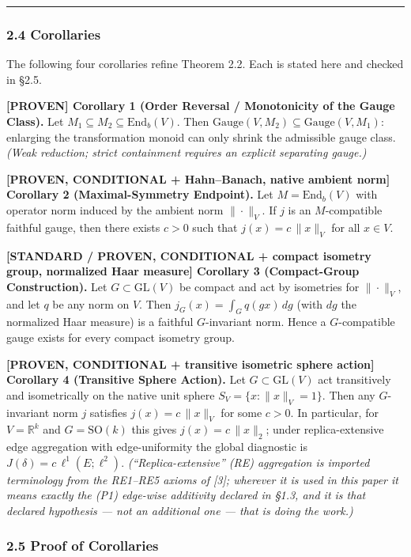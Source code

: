 \documentclass[
  11pt,
]{article}
\renewenvironment{quote}
  {\begin{leftbar}\small}
  {\end{leftbar}}
\begin{document}
\begin{center}\rule{0.5\linewidth}{0.5pt}\end{center}

\subsubsection{2.4 Corollaries}\label{corollaries}

The following four corollaries refine Theorem 2.2. Each is stated here and checked in §2.5.

\begin{quote}
\textbf{{[}PROVEN{]} Corollary 1 (Order Reversal / Monotonicity of the Gauge Class).} Let \(M_1 \subseteq M_2 \subseteq \mathrm{End}_b(V)\). Then \(\mathrm{Gauge}(V, M_2) \subseteq \mathrm{Gauge}(V, M_1)\): enlarging the transformation monoid can only shrink the admissible gauge class. \emph{(Weak reduction; strict containment requires an explicit separating gauge.)}

\textbf{{[}PROVEN, CONDITIONAL + Hahn--Banach, native ambient norm{]} Corollary 2 (Maximal-Symmetry Endpoint).} Let \(M = \mathrm{End}_b(V)\) with operator norm induced by the ambient norm \(\|\cdot\|_V\). If \(j\) is an \(M\)-compatible faithful gauge, then there exists \(c > 0\) such that \(j(x) = c\,\|x\|_V\) for all \(x \in V\).

\textbf{{[}STANDARD / PROVEN, CONDITIONAL + compact isometry group, normalized Haar measure{]} Corollary 3 (Compact-Group Construction).} Let \(G \subset \mathrm{GL}(V)\) be compact and act by isometries for \(\|\cdot\|_V\), and let \(q\) be any norm on \(V\). Then \(j_G(x) = \int_G q(gx)\,dg\) (with \(dg\) the normalized Haar measure) is a faithful \(G\)-invariant norm. Hence a \(G\)-compatible gauge exists for every compact isometry group.

\textbf{{[}PROVEN, CONDITIONAL + transitive isometric sphere action{]} Corollary 4 (Transitive Sphere Action).} Let \(G \subset \mathrm{GL}(V)\) act transitively and isometrically on the native unit sphere \(S_V = \{x : \|x\|_V = 1\}\). Then any \(G\)-invariant norm \(j\) satisfies \(j(x) = c\,\|x\|_V\) for some \(c > 0\). In particular, for \(V = \mathbb{R}^k\) and \(G = \mathrm{SO}(k)\) this gives \(j(x) = c\,\|x\|_2\); under replica-extensive edge aggregation with edge-uniformity the global diagnostic is \(J(\delta) = c\,\ell^1(E;\ell^2)\). \emph{(``Replica-extensive'' (RE) aggregation is imported terminology from the RE1--RE5 axioms of {[}3{]}; wherever it is used in this paper it means exactly the (P1) edge-wise additivity declared in §1.3, and it is that declared hypothesis --- not an additional one --- that is doing the work.)}

\subsubsection{2.5 Proof of Corollaries}\label{proof-of-corollaries}
\end{quote}
\end{document}
